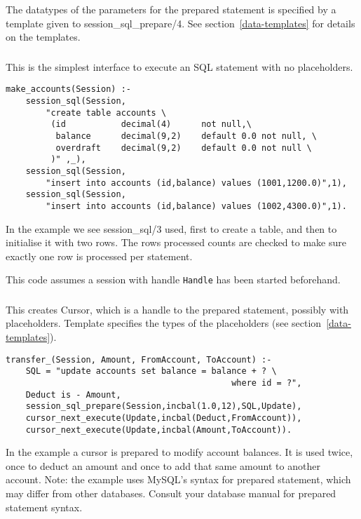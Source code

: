 The datatypes of the parameters for the prepared statement is specified by
a template given to session_sql_prepare/4. See section~\ref{data-templates}
for details on the templates.  

\subsubsection{}
\label{session-sql/3}

This is the simplest interface to execute an SQL statement with no
placeholders.

\begin{verbatim}
make_accounts(Session) :-
    session_sql(Session,
        "create table accounts \
         (id           decimal(4)      not null,\
          balance      decimal(9,2)    default 0.0 not null, \
          overdraft    decimal(9,2)    default 0.0 not null \
         )" ,_),
    session_sql(Session,
        "insert into accounts (id,balance) values (1001,1200.0)",1),
    session_sql(Session,
        "insert into accounts (id,balance) values (1002,4300.0)",1).
\end{verbatim}
In the example we see session_sql/3 used, first to create a
table, and then to initialise it with two rows. The rows processed counts
are checked to make sure exactly one row is processed per statement.

This code assumes a session with handle {\tt Handle} has been started beforehand.

\subsubsection{}
\label{session-sql-prepare/4}

This creates Cursor, which is a handle to the prepared statement,
possibly with placeholders. Template specifies the types of the placeholders 
(see section~\ref{data-templates}). 

\begin{verbatim}
transfer_(Session, Amount, FromAccount, ToAccount) :-
    SQL = "update accounts set balance = balance + ? \
                                             where id = ?",
    Deduct is - Amount,
    session_sql_prepare(Session,incbal(1.0,12),SQL,Update),
    cursor_next_execute(Update,incbal(Deduct,FromAccount)),
    cursor_next_execute(Update,incbal(Amount,ToAccount)).
\end{verbatim}
In the example a cursor is prepared to modify account balances. It is used
twice, once to deduct an amount and once to add that same amount to
another account. Note: the example uses MySQL's syntax for prepared
statement, which may differ from other databases. Consult your database manual for
prepared statement syntax.

